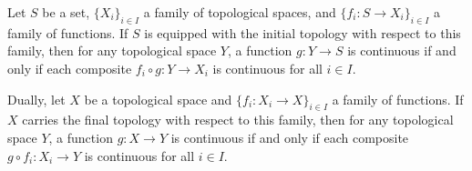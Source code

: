 \begin{proposition} \label{proposition:continuous_maps_and_initial_final_topologies}

    Let $S$ be a set, $\{X_i\}_{i \in I}$ a family of topological spaces, and $\{f_i : S \to X_i\}_{i \in I}$ a family of functions. If $S$ is equipped with the initial topology with respect to this family, then for any topological space $Y$, a function $g : Y \to S$ is continuous if and only if each composite $f_i \circ g : Y \to X_i$ is continuous for all $i \in I$.

    Dually, let $X$ be a topological space and $\{f_i : X_i \to X\}_{i \in I}$ a family of functions. If $X$ carries the final topology with respect to this family, then for any topological space $Y$, a function $g : X \to Y$ is continuous if and only if each composite $g \circ f_i : X_i \to Y$ is continuous for all $i \in I$.
\end{proposition}
